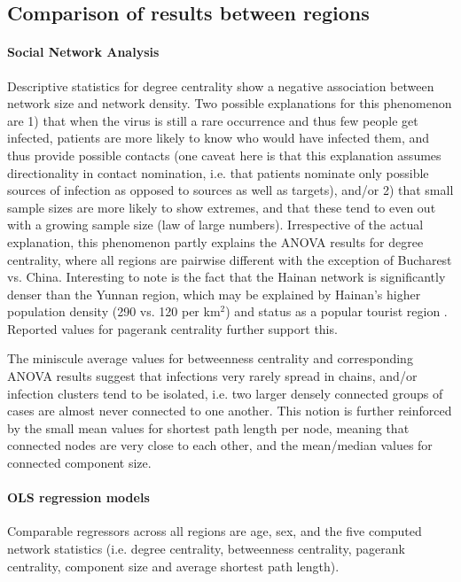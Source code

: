 \subsection{Comparison of results between regions}
\label{sec:discussion_regions}

\paragraph{Social Network Analysis} Descriptive statistics for degree centrality show a negative association between network size and network density. Two possible explanations for this phenomenon are 1) that when the virus is still a rare occurrence and thus few people get infected, patients are more likely to know who would have infected them, and thus provide possible contacts (one caveat here is that this explanation assumes directionality in contact nomination, i.e. that patients nominate only possible sources of infection as opposed to sources as well as targets), and/or 2) that small sample sizes are more likely to show extremes, and that these tend to even out with a growing sample size (law of large numbers). Irrespective of the actual explanation, this phenomenon partly explains the ANOVA results for degree centrality, where all regions are pairwise different with the exception of Bucharest vs. China. Interesting to note is the fact that the Hainan network is significantly denser than the Yunnan region, which may be explained by Hainan's higher population density (290 vs. 120 per km$^2$) and status as a popular tourist region \cite{wiki_yunnan,wiki_hainan}. Reported values for pagerank centrality further support this.

The miniscule average values for betweenness centrality and corresponding ANOVA results suggest that infections very rarely spread in chains, and/or infection clusters tend to be isolated, i.e. two larger densely connected groups of cases are almost never connected to one another. This notion is further reinforced by the small mean values for shortest path length per node, meaning that connected nodes are very close to each other, and the mean/median values for connected component size.

\paragraph{OLS regression models} Comparable regressors across all regions are age, sex, and the five computed network statistics (i.e. degree centrality, betweenness centrality, pagerank centrality, component size and average shortest path length). 

